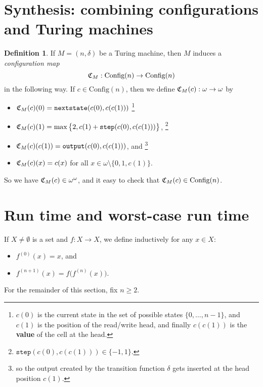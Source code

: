 \documentclass[12pt, a4paper]{amsart}
\theoremstyle{definition}
\newtheorem{definition}[lemma]{Definition}
\newcommand{\C}{\text{Config}}
\begin{document}
\section{Synthesis: combining configurations and Turing machines}

\begin{definition}
    If $M=(n,\delta)$ be a Turing machine, then $M$ induces a {\em configuration
    map} $${\frak C}_M: \C(n)\to \C(n)$$ in the following way. If $c\in \C(n)$,
    then we define ${\frak C}_M(c): \omega \to \omega$ by

    \begin{itemize}
        \item ${\frak C}_M(c)(0) = \mathtt{nextstate}(c(0), c(c(1)))$
            \footnote{$c(0)$ is the current state 
            in the set of possible states $\{0,\ldots,n-1\}$, and $c(1)$
            is the position of the read/write head, and finally $c(c(1))$ is the
            {\bf value} of the cell at the head.}
        \item ${\frak C}_M(c)(1) = 
            \max\big\{2, c(1) + \mathtt{step}(c(0), c(c(1)))\big\}$,
            \footnote{$\mathtt{step}(c(0),c(c(1)))\in\{-1,1\}$.}
        \item ${\frak C}_M(c)(c(1)) = \mathtt{output}(c(0), c(c(1)))$, and
            \footnote{so the output created by the transition function $\delta$ gets
            inserted at the head position $c(1)$.}
        \item ${\frak C}_M(c)(x) = c(x)$ for all $x\in\omega \setminus \{0,1,c(1)\}$. 
    \end{itemize}
    So we have ${\frak C}_M(c) \in \omega^\omega$, and it easy to check that
    ${\frak C}_M(c) \in \C(n)$. 
\end{definition}

\section{Run time and worst-case run time}

If $X\neq \emptyset$ is a set and $f:X\to X$, we define inductively for any $x\in X$:
\begin{itemize}
    \item $f^{(0)}(x) = x$, and
    \item $f^{(n+1)}(x) = f\big(f^{(n)}(x)\big)$.
\end{itemize}

For the remainder of this section, fix $n\geq 2$.
\end{document}
